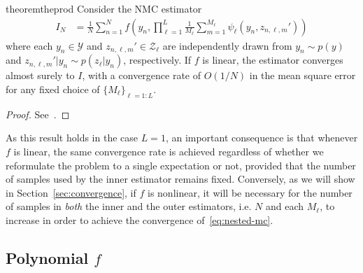 \vspace{-5pt}
\begin{restatable}{theorem}{theprod}
	\label{the:prod}
	Consider the NMC estimator
	\begin{align*}
	I_{N} &= \frac{1}{N}\sum_{n=1}^N f\left(y_n,\prod_{\ell=1}^{L} \frac{1}{M_{\ell}} \sum_{m=1}^{M_{\ell}} \psi_{\ell}(y_n,z_{n,\ell,m}')\right)
	\end{align*}
	where each $y_n \in \mathcal{Y}$ and $z_{n,\ell,m}' \in \mathcal{Z}_{\ell}$ are independently drawn from 
	$y_n \sim p(y)$ and $z_{n,\ell,m}' | y_n \sim p(z_{\ell} | y_n)$, respectively. If $f$ is linear, 
        the estimator converges almost surely to $I$,
	with a convergence rate of $O(1/N)$ in the mean square error for any fixed choice of $\{M_{\ell}\}_{\ell = 1:L}$.
\end{restatable}
\vspace{-12pt}
\begin{proof}
	See~\citep{rainforth2017pitfalls}.
\end{proof}

\noindent As this result holds in the case $L=1$, an important consequence is that
whenever $f$ is linear, the same convergence rate is achieved regardless of whether we
reformulate the problem to a single expectation or not, provided that the number of samples
used by the inner estimator remains fixed.  
Conversely, as we will show in Section~\ref{sec:convergence},
if $f$ is nonlinear, it will be necessary for the number of samples in \emph{both} the inner and the 
outer estimators, i.e. $N$ and each $M_{\ell}$, to increase in order to achieve the convergence of~\eqref{eq:nested-mc}. 

\subsection{Polynomial $f$}
\label{sec:polynomial}

